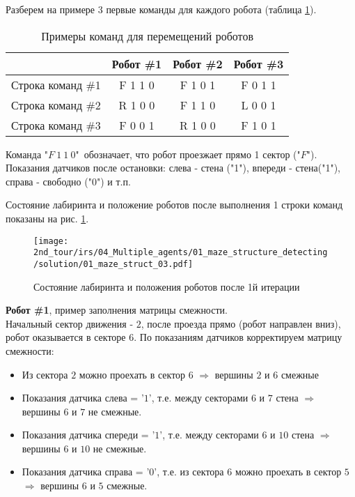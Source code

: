 Разберем на примере 3 первые команды для каждого робота (таблица \ref{table:01_maze_struct_01}).
\\

\begin{table}[H]
	\begin{center}
		\begin{tabular}{|c|c|c|c|}
			\hline 
			& Робот \#1 & Робот \#2 & Робот \#3 \\ 
			\hline 
			Строка команд \#1 & F 1 1 0 & F 1 0 1 & F 0 1 1 \\ 
			\hline 
			Строка команд \#2 & R 1 0 0 & F 1 1 0 & L 0 0 1 \\ 
			\hline 
			Строка команд \#3 & F 0 0 1 & R 1 0 0 & F 1 0 1 \\ 
			\hline 
		\end{tabular} 
		\caption{Примеры команд для перемещений роботов}
		\label{table:01_maze_struct_01}
	\end{center}
\end{table}


Команда "$F\ 1\ 1\ 0$"\ обозначает, что робот проезжает прямо 1 сектор ("$F$"). Показания датчиков после остановки: слева - стена ("1"), впереди - стена("1"), справа - свободно ("0") и т.п. 

Состояние лабиринта и положение роботов после выполнения 1 строки команд показаны на рис. \ref{fig:01_maze_struct_03}.
\begin{figure}[H]
	\centering
	\texttt{[image: 2nd\_tour/irs/04\_Multiple\_agents/01\_maze\_structure\_detecting/solution/01\_maze\_struct\_03.pdf]}
	\caption{Состояние лабиринта и положения роботов после 1й итерации}
	\label{fig:01_maze_struct_03}
\end{figure}

\textbf{Робот \#1}, пример заполнения матрицы смежности.\\ Начальный сектор движения - $2$, после проезда прямо (робот направлен вниз), робот оказывается в секторе $6$. По показаниям датчиков корректируем матрицу смежности: 
\begin{itemize}
	\item Из сектора $2$ можно проехать в сектор $6$ $\Rightarrow$ вершины $2$ и $6$ смежные
	\item Показания датчика слева = '$1$', т.е. между секторами $6$ и $7$ стена $\Rightarrow$ вершины $6$ и $7$ не смежные.
	\item Показания датчика спереди = '$1$', т.е. между секторами $6$ и $10$ стена $\Rightarrow$ вершины $6$ и $10$ не смежные.
	\item Показания датчика справа = '$0$', т.е. из сектора $6$ можно проехать в сектор $5$ $\Rightarrow$ вершины $6$ и $5$ смежные.
\end{itemize}

